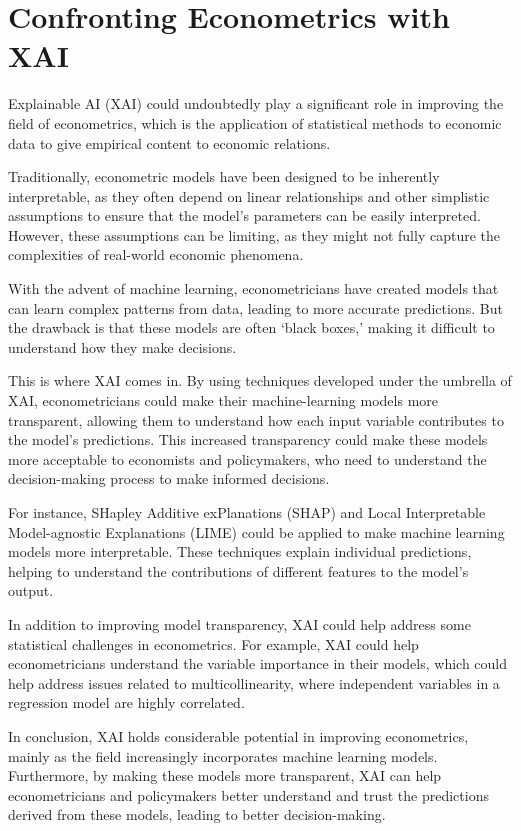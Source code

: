 \documentclass[
  letterpaper,
  DIV=11,
  numbers=noendperiod]{scrartcl}
\begin{document}
\hypertarget{confronting-econometrics-with-xai}{%
\section{Confronting Econometrics with
XAI}\label{confronting-econometrics-with-xai}}

Explainable AI (XAI) could undoubtedly play a significant role in
improving the field of econometrics, which is the application of
statistical methods to economic data to give empirical content to
economic relations.

Traditionally, econometric models have been designed to be inherently
interpretable, as they often depend on linear relationships and other
simplistic assumptions to ensure that the model's parameters can be
easily interpreted. However, these assumptions can be limiting, as they
might not fully capture the complexities of real-world economic
phenomena.

With the advent of machine learning, econometricians have created models
that can learn complex patterns from data, leading to more accurate
predictions. But the drawback is that these models are often `black
boxes,' making it difficult to understand how they make decisions.

This is where XAI comes in. By using techniques developed under the
umbrella of XAI, econometricians could make their machine-learning
models more transparent, allowing them to understand how each input
variable contributes to the model's predictions. This increased
transparency could make these models more acceptable to economists and
policymakers, who need to understand the decision-making process to make
informed decisions.

For instance, SHapley Additive exPlanations (SHAP) and Local
Interpretable Model-agnostic Explanations (LIME) could be applied to
make machine learning models more interpretable. These techniques
explain individual predictions, helping to understand the contributions
of different features to the model's output.

In addition to improving model transparency, XAI could help address some
statistical challenges in econometrics. For example, XAI could help
econometricians understand the variable importance in their models,
which could help address issues related to multicollinearity, where
independent variables in a regression model are highly correlated.

In conclusion, XAI holds considerable potential in improving
econometrics, mainly as the field increasingly incorporates machine
learning models. Furthermore, by making these models more transparent,
XAI can help econometricians and policymakers better understand and
trust the predictions derived from these models, leading to better
decision-making.
\end{document}
